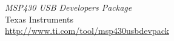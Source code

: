 \begin{thebibliography}{widest-label}
	\emph{MSP430 USB Developers Package}\\
	Texas Instruments\\
	\url{http://www.ti.com/tool/msp430usbdevpack}




\end{thebibliography}
